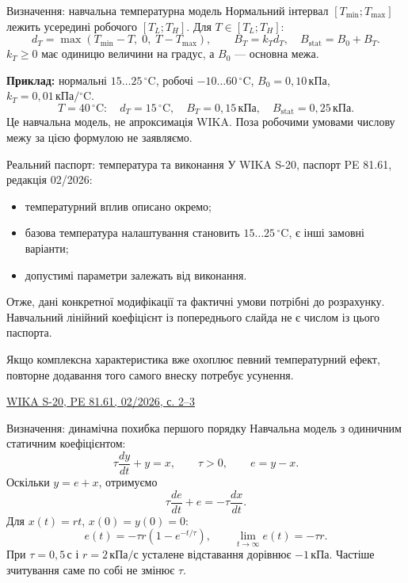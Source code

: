 \documentclass[aspectratio=169,11pt]{beamer}
\newcommand{\unit}[1]{\,\text{#1}}
\newcommand{\src}[2]{\par\vfill{\tiny\href{#1}{#2}}}
\begin{document}
\begin{frame}{Визначення: навчальна температурна модель}
Нормальний інтервал $[T_{\min};T_{\max}]$ лежить усередині робочого $[T_L;T_H]$. Для $T\in[T_L;T_H]$:
\[
d_T=\max(T_{\min}-T,\;0,\;T-T_{\max}),
\qquad B_T=k_Td_T,\quad B_{\mathrm{stat}}=B_0+B_T.
\]
$k_T\ge0$ має одиницю величини на градус, а $B_0$ — основна межа.
\medskip

\textbf{Приклад:} нормальні $15\ldots25\,{}^\circ\mathrm C$, робочі $-10\ldots60\,{}^\circ\mathrm C$, $B_0=0{,}10\unit{кПа}$, $k_T=0{,}01\unit{кПа}/{}^\circ\mathrm C$.
\[
T=40\,{}^\circ\mathrm C:\quad d_T=15\,{}^\circ\mathrm C,\quad B_T=0{,}15\unit{кПа},\quad B_{\mathrm{stat}}=0{,}25\unit{кПа}.
\]
Це навчальна модель, не апроксимація WIKA. Поза робочими умовами числову межу за цією формулою не заявляємо.
\end{frame}

\begin{frame}{Реальний паспорт: температура та виконання}
У WIKA S-20, паспорт PE 81.61, редакція 02/2026:
\begin{itemize}
\item температурний вплив описано окремо;
\item базова температура налаштування становить $15\ldots25\,{}^\circ\mathrm C$, є інші замовні варіанти;
\item допустимі параметри залежать від виконання.
\end{itemize}
Отже, дані конкретної модифікації та фактичні умови потрібні до розрахунку. Навчальний лінійний коефіцієнт із попереднього слайда не є числом із цього паспорта.
\medskip

Якщо комплексна характеристика вже охоплює певний температурний ефект, повторне додавання того самого внеску потребує усунення.
\src{https://www.wika.com/media/Data-sheets/Pressure/Pressure-sensors/ds_pe8161_en_co.pdf}{WIKA S-20, PE 81.61, 02/2026, с. 2–3}
\end{frame}

\begin{frame}{Визначення: динамічна похибка першого порядку}
Навчальна модель з одиничним статичним коефіцієнтом:
\[
\tau\frac{dy}{dt}+y=x,\qquad \tau>0,\qquad e=y-x.
\]
Оскільки $y=e+x$, отримуємо
\[
\tau\frac{de}{dt}+e=-\tau\frac{dx}{dt}.
\]
Для $x(t)=rt$, $x(0)=y(0)=0$:
\[
e(t)=-\tau r\left(1-e^{-t/\tau}\right),\qquad
\lim_{t\to\infty}e(t)=-\tau r.
\]
При $\tau=0{,}5\unit{с}$ і $r=2\unit{кПа/с}$ усталене відставання дорівнює $-1\unit{кПа}$. Частіше зчитування саме по собі не змінює $\tau$.
\end{frame}
\end{document}
